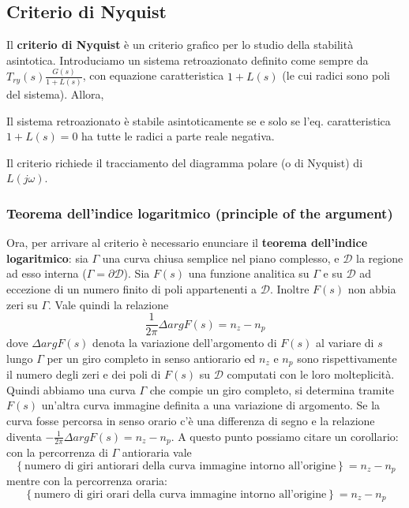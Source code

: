 \documentclass[11pt]{article}
\begin{document}
\subsection{Criterio di Nyquist}
Il \textbf{criterio di Nyquist} è un criterio grafico per lo studio della stabilità asintotica. Introduciamo un sistema retroazionato definito come sempre da $T_{ry}(s)\frac{G(s)}{1+L(s)}$, con equazione caratteristica $1+L(s)$ (le cui radici sono poli del sistema). Allora,
\begin{center}
    Il sistema retroazionato è stabile asintoticamente se e solo se l'eq. caratteristica $1+L(s)=0$ ha tutte le radici a parte reale negativa. 
\end{center}
Il criterio richiede il tracciamento del diagramma polare (o di Nyquist) di $L(j\omega)$.
\subsubsection{Teorema dell'indice logaritmico (principle of the argument)}
Ora, per arrivare al criterio è necessario enunciare il \textbf{teorema dell'indice logaritmico}: sia $\Gamma$ una curva chiusa semplice nel piano complesso, e $\mathcal{D}$ la regione ad esso interna ($\Gamma = \partial \mathcal{D}$). Sia $F(s)$ una funzione analitica su $\Gamma$ e su $\mathcal{D}$ ad eccezione di un numero finito di poli appartenenti a $\mathcal{D}$. Inoltre $F(s)$ non abbia zeri su $\Gamma$. Vale quindi la relazione 
\begin{displaymath}
    \frac{1}{2\pi} \Delta arg F(s) = n_z - n_p
\end{displaymath}
dove $\Delta arg F(s)$ denota la variazione dell'argomento di $F(s)$ al variare di $s$ lungo $\Gamma$ per un giro completo in senso antiorario ed $n_z$ e $n_p$ sono rispettivamente il numero degli zeri e dei poli di $F(s)$ su $\mathcal{D}$ computati con le loro molteplicità. Quindi abbiamo una curva $\Gamma$ che compie un giro completo, si determina tramite $F(s)$ un'altra curva immagine definita a una variazione di argomento. Se la curva fosse percorsa in senso orario c'è una differenza di segno e la relazione diventa $-\frac{1}{2\pi} \Delta arg F(s) = n_z - n_p$. A questo punto possiamo citare un corollario: con la percorrenza di $\Gamma$ antioraria vale
\begin{displaymath}
    \left\{\textrm{numero di giri antiorari della curva immagine intorno all'origine}\right\} = n_z-n_p
\end{displaymath}
mentre con la percorrenza oraria:
\begin{displaymath}
    \left\{\textrm{numero di giri orari della curva immagine intorno all'origine}\right\} = n_z-n_p
\end{displaymath}
\end{document}
